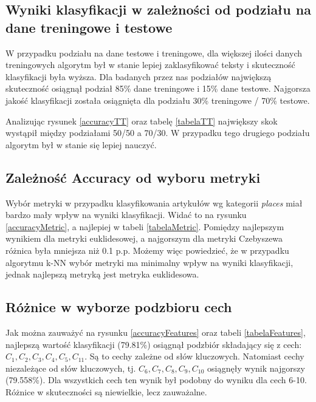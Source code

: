 \documentclass{classrep}
\begin{document}
\subsection{Wyniki klasyfikacji w zależności od podziału na dane treningowe i testowe}
W przypadku podziału na dane testowe i treningowe, dla większej ilości danych treningowych algorytm był w stanie lepiej zaklasyfikować teksty i skuteczność klasyfikacji była wyższa. Dla badanych przez nas podziałów największą skuteczność osiągnął podział 85\% dane treningowe i 15\% dane testowe. Najgorsza jakość klasyfikacji została osiągnięta dla podziału 30\% treningowe / 70\% testowe. 

Analizując rysunek \ref{accuracyTT} oraz tabelę \ref{tabelaTT} największy skok wystąpił między podziałami 50/50 a 70/30. W przypadku tego drugiego podziału algorytm był w stanie się lepiej nauczyć.
\subsection{Zależność Accuracy od wyboru metryki}
Wybór metryki w przypadku klasyfikowania artykułów wg kategorii \textsl{places} miał bardzo mały wpływ na wyniki klasyfikacji. Widać to na rysunku \ref{accuracyMetric}, a najlepiej w tabeli \ref{tabelaMetric}. Pomiędzy najlepszym wynikiem dla metryki euklidesowej, a najgorszym dla metryki Czebyszewa różnica była mniejsza niż 0.1 p.p. Możemy więc powiedzieć, że w przypadku algorytmu k-NN wybór metryki ma minimalny wpływ na wyniki klasyfikacji, jednak najlepszą metryką jest metryka euklidesowa.
\subsection{Różnice w wyborze podzbioru cech}
Jak można zauważyć na rysunku \ref{accuracyFeatures} oraz tabeli \ref{tabelaFeatures}, najlepszą wartość klasyfikacji (79.81\%) osiągnął podzbiór składający się z cech: $C_1, C_2, C_3, C_4, C_5, C_{11}$. Są to cechy zależne od słów kluczowych. Natomiast cechy niezależące od słów kluczowych, tj. $C_6, C_7, C_8, C_9, C_{10}$ osiągnęły wynik najgorszy (79.558\%). Dla wszystkich cech ten wynik był podobny do wyniku dla cech 6-10. Różnice w skuteczności są niewielkie, lecz zauważalne. 

\newpage
\end{document}
